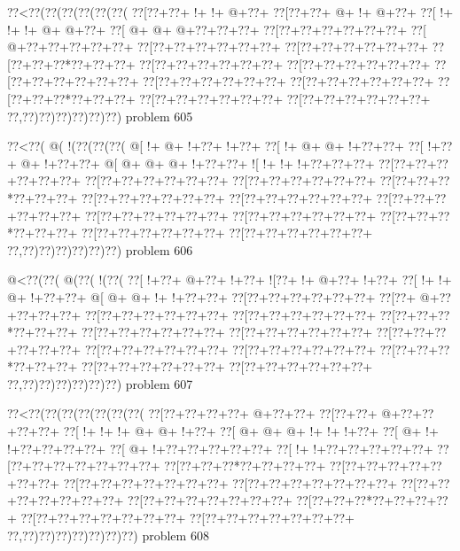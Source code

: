 \vbox{\vbox{\goo
\0??<\0??(\0??(\0??(\0??(\0??(\0??(
\0??[\0??+\0??+\- !+\- !+\- @+\0??+
\0??[\0??+\0??+\- @+\- !+\- @+\0??+
\0??[\- !+\- !+\- !+\- @+\- @+\0??+
\0??[\- @+\- @+\- @+\0??+\0??+\0??+
\0??[\0??+\0??+\0??+\0??+\0??+\0??+
\0??[\- @+\0??+\0??+\0??+\0??+\0??+
\0??[\0??+\0??+\0??+\0??+\0??+\0??+
\0??[\0??+\0??+\0??+\0??+\0??+\0??+
\0??[\0??+\0??+\0??*\0??+\0??+\0??+
\0??[\0??+\0??+\0??+\0??+\0??+\0??+
\0??[\0??+\0??+\0??+\0??+\0??+\0??+
\0??[\0??+\0??+\0??+\0??+\0??+\0??+
\0??[\0??+\0??+\0??+\0??+\0??+\0??+
\0??[\0??+\0??+\0??+\0??+\0??+\0??+
\0??[\0??+\0??+\0??*\0??+\0??+\0??+
\0??[\0??+\0??+\0??+\0??+\0??+\0??+
\0??[\0??+\0??+\0??+\0??+\0??+\0??+
\0??,\0??)\0??)\0??)\0??)\0??)\0??)
}
\hfil problem 605\hfil\break
}

\vbox{\vbox{\goo
\0??<\0??(\- @(\- !(\0??(\0??(\0??(
\- @[\- !+\- @+\- !+\0??+\- !+\0??+
\0??[\- !+\- @+\- @+\- !+\0??+\0??+
\0??[\- !+\0??+\- @+\- !+\0??+\0??+
\- @[\- @+\- @+\- @+\- !+\0??+\0??+
\- ![\- !+\- !+\- !+\0??+\0??+\0??+
\0??[\0??+\0??+\0??+\0??+\0??+\0??+
\0??[\0??+\0??+\0??+\0??+\0??+\0??+
\0??[\0??+\0??+\0??+\0??+\0??+\0??+
\0??[\0??+\0??+\0??*\0??+\0??+\0??+
\0??[\0??+\0??+\0??+\0??+\0??+\0??+
\0??[\0??+\0??+\0??+\0??+\0??+\0??+
\0??[\0??+\0??+\0??+\0??+\0??+\0??+
\0??[\0??+\0??+\0??+\0??+\0??+\0??+
\0??[\0??+\0??+\0??+\0??+\0??+\0??+
\0??[\0??+\0??+\0??*\0??+\0??+\0??+
\0??[\0??+\0??+\0??+\0??+\0??+\0??+
\0??[\0??+\0??+\0??+\0??+\0??+\0??+
\0??,\0??)\0??)\0??)\0??)\0??)\0??)
}
\hfil problem 606\hfil\break
}

\vbox{\vbox{\goo
\- @<\0??(\0??(\- @(\0??(\- !(\0??(
\0??[\- !+\0??+\- @+\0??+\- !+\0??+
\- ![\0??+\- !+\- @+\0??+\- !+\0??+
\0??[\- !+\- !+\- @+\- !+\0??+\0??+
\- @[\- @+\- @+\- !+\- !+\0??+\0??+
\0??[\0??+\0??+\0??+\0??+\0??+\0??+
\0??[\0??+\- @+\0??+\0??+\0??+\0??+
\0??[\0??+\0??+\0??+\0??+\0??+\0??+
\0??[\0??+\0??+\0??+\0??+\0??+\0??+
\0??[\0??+\0??+\0??*\0??+\0??+\0??+
\0??[\0??+\0??+\0??+\0??+\0??+\0??+
\0??[\0??+\0??+\0??+\0??+\0??+\0??+
\0??[\0??+\0??+\0??+\0??+\0??+\0??+
\0??[\0??+\0??+\0??+\0??+\0??+\0??+
\0??[\0??+\0??+\0??+\0??+\0??+\0??+
\0??[\0??+\0??+\0??*\0??+\0??+\0??+
\0??[\0??+\0??+\0??+\0??+\0??+\0??+
\0??[\0??+\0??+\0??+\0??+\0??+\0??+
\0??,\0??)\0??)\0??)\0??)\0??)\0??)
}
\hfil problem 607\hfil\break
}

\vbox{\vbox{\goo
\0??<\0??(\0??(\0??(\0??(\0??(\0??(\0??(
\0??[\0??+\0??+\0??+\0??+\- @+\0??+\0??+
\0??[\0??+\0??+\- @+\0??+\0??+\0??+\0??+
\0??[\- !+\- !+\- !+\- @+\- @+\- !+\0??+
\0??[\- @+\- @+\- @+\- !+\- !+\- !+\0??+
\0??[\- @+\- !+\- !+\0??+\0??+\0??+\0??+
\0??[\- @+\- !+\0??+\0??+\0??+\0??+\0??+
\0??[\- !+\- !+\0??+\0??+\0??+\0??+\0??+
\0??[\0??+\0??+\0??+\0??+\0??+\0??+\0??+
\0??[\0??+\0??+\0??*\0??+\0??+\0??+\0??+
\0??[\0??+\0??+\0??+\0??+\0??+\0??+\0??+
\0??[\0??+\0??+\0??+\0??+\0??+\0??+\0??+
\0??[\0??+\0??+\0??+\0??+\0??+\0??+\0??+
\0??[\0??+\0??+\0??+\0??+\0??+\0??+\0??+
\0??[\0??+\0??+\0??+\0??+\0??+\0??+\0??+
\0??[\0??+\0??+\0??*\0??+\0??+\0??+\0??+
\0??[\0??+\0??+\0??+\0??+\0??+\0??+\0??+
\0??[\0??+\0??+\0??+\0??+\0??+\0??+\0??+
\0??,\0??)\0??)\0??)\0??)\0??)\0??)\0??)
}
\hfil problem 608\hfil\break
}

